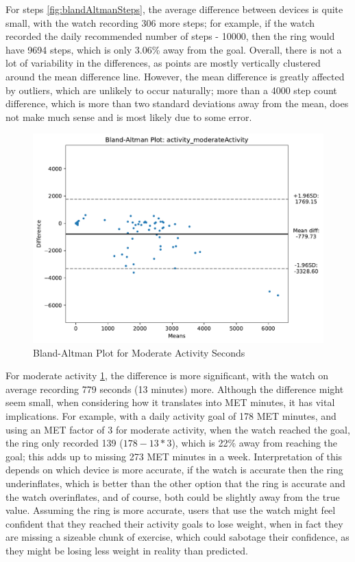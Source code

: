 For steps \ref{fig:blandAltmanSteps}, the average difference between devices is quite small, with the watch recording 306 more steps; for example, if the watch recorded the daily recommended number of steps - 10000, then the ring would have 9694 steps, which is only 3.06\% away from the goal. Overall, there is not a lot of variability in the differences, as points are mostly vertically clustered around the mean difference line. However, the mean difference is greatly affected by outliers, which are unlikely to occur naturally; more than a 4000 step count difference, which is more than two standard deviations away from the mean, does not make much sense and is most likely due to some error. 
\begin{figure}
    
    \centering
    \includegraphics[width=\textwidth,keepaspectratio]{../images/bland_altman_moderateActivity.pdf}
    \caption{Bland-Altman Plot for Moderate Activity Seconds}
    \label{fig:blandAltmanSoftActivity}
    
\end{figure}

For moderate activity \ref{fig:blandAltmanSoftActivity}, the difference is more significant, with the watch on average recording 779 seconds (13 minutes) more. Although the difference might seem small, when considering how it translates into MET minutes, it has vital implications. For example, with a daily activity goal of 178 MET minutes, and using an MET factor of 3 for moderate activity, when the watch reached the goal, the ring only recorded 139 ($178 - 13 * 3$), which is 22\% away from reaching the goal; this adds up to missing 273 MET minutes in a week. Interpretation of this depends on which device is more accurate, if the watch is accurate then the ring underinflates, which is better than the other option that the ring is accurate and the watch overinflates, and of course, both could be slightly away from the true value. Assuming the ring is more accurate, users that use the watch might feel confident that they reached their activity goals to lose weight, when in fact they are missing a sizeable chunk of exercise, which could sabotage their confidence, as they might be losing less weight in reality than predicted. 

